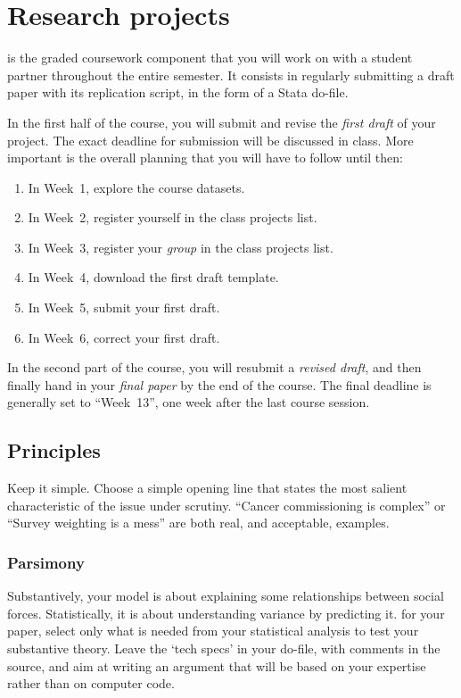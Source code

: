 \chapter{Research projects}%
	\label{ch:paper}

 is the graded coursework component that you will work on with a student partner throughout the entire semester. It consists in regularly submitting a draft paper with its replication script, in the form of a Stata do-file.

In the first half of the course, you will submit and revise the \emph{first draft} of your project. The exact deadline for submission will be discussed in class. More important is the overall planning that you will have to follow until then:

\begin{enumerate}
  \item In Week~1, explore the course datasets.
  \item In Week~2, register yourself in the class projects list.
  \item In Week~3, register your \emph{group} in the class projects list.
  \item In Week~4, download the first draft template.
  \item In Week~5, submit your first draft.
  \item In Week~6, correct your first draft.
\end{enumerate}

In the second part of the course, you will resubmit a \emph{revised draft}, and then finally hand in your \emph{final paper} by the end of the course. The final deadline is generally set to ``Week~13'', one week after the last course session.

\section{Principles}

Keep it simple. Choose a simple opening line that states the most salient characteristic of the issue under scrutiny. ``Cancer commissioning is complex'' or ``Survey weighting is a mess'' are both real, and acceptable, examples.

\subsection{Parsimony}

Substantively, your model is about explaining some relationships between social forces. Statistically, it is about understanding variance by predicting it. for your paper, select only what is needed from your statistical analysis to test your substantive theory. Leave the `tech specs' in your do-file, with comments in the source, and aim at writing an argument that will be based on your expertise rather than on computer code.%


